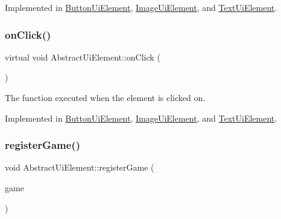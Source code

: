 Implemented in \mbox{\hyperlink{class_button_ui_element_ab321d646770df66f7ea58a7246d7bf28}{Button\+Ui\+Element}}, \mbox{\hyperlink{class_image_ui_element_a6d0f66cf68c5f035f5a9bfeaba3028f4}{Image\+Ui\+Element}}, and \mbox{\hyperlink{class_text_ui_element_aaf04a9d0a67e77e2ba2a306e1ec7aeed}{Text\+Ui\+Element}}.

\mbox{\label{class_abstract_ui_element_a42296c15c9e70b6ac7fda0b1862612af}} 
\subsubsection{\texorpdfstring{on\+Click()}{onClick()}}
{\footnotesize\ttfamily virtual void Abstract\+Ui\+Element\+::on\+Click (\begin{DoxyParamCaption}{ }\end{DoxyParamCaption})\hspace{0.3cm}{\ttfamily [pure virtual]}}



The function executed when the element is clicked on. 



Implemented in \mbox{\hyperlink{class_button_ui_element_a06c748ef9e81216f76d7db936d320365}{Button\+Ui\+Element}}, \mbox{\hyperlink{class_image_ui_element_ab3c388de0807d86016a2ff43fd6d337e}{Image\+Ui\+Element}}, and \mbox{\hyperlink{class_text_ui_element_a984d8bcd627f43c1bd858a707df2c042}{Text\+Ui\+Element}}.

\mbox{\label{class_abstract_ui_element_aea8a32a77e77f601ca114b8738072079}} 
\subsubsection{\texorpdfstring{register\+Game()}{registerGame()}}
{\footnotesize\ttfamily void Abstract\+Ui\+Element\+::register\+Game (\begin{DoxyParamCaption}\item[{\mbox{\hyperlink{class_abstract_game}{Abstract\+Game}} $\ast$}]{game }\end{DoxyParamCaption})\hspace{0.3cm}{\ttfamily [virtual]}}



